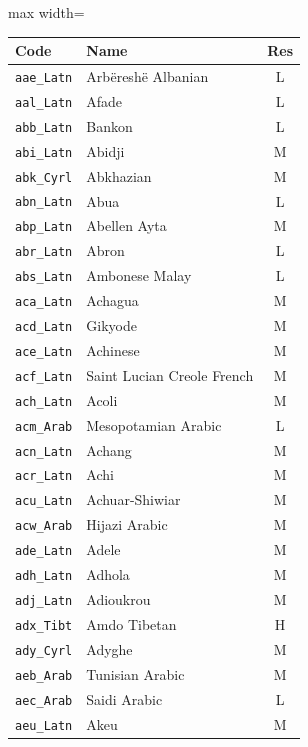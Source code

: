 {
    \tiny\renewcommand{\arraystretch}{.8}
    \begin{adjustbox}{max width=\textwidth}
    \begin{tabular}{llc}
        \toprule
        \textbf{Code} & \textbf{Name} & \textbf{Res}\\
        \midrule
        \texttt{aae\_Latn} & Arbëreshë Albanian & L \\
        \texttt{aal\_Latn} & Afade & L \\
        \texttt{abb\_Latn} & Bankon & L \\
        \texttt{abi\_Latn} & Abidji & M \\
        \texttt{abk\_Cyrl} & Abkhazian & M \\
        \texttt{abn\_Latn} & Abua & L \\
        \texttt{abp\_Latn} & Abellen Ayta & M \\
        \texttt{abr\_Latn} & Abron & L \\
        \texttt{abs\_Latn} & Ambonese Malay & L \\
        \texttt{aca\_Latn} & Achagua & M \\
        \texttt{acd\_Latn} & Gikyode & M \\
        \texttt{ace\_Latn} & Achinese & M \\
        \texttt{acf\_Latn} & Saint Lucian Creole French & M \\
        \texttt{ach\_Latn} & Acoli & M \\
        \texttt{acm\_Arab} & Mesopotamian Arabic & L \\
        \texttt{acn\_Latn} & Achang & M \\
        \texttt{acr\_Latn} & Achi & M \\
        \texttt{acu\_Latn} & Achuar-Shiwiar & M \\
        \texttt{acw\_Arab} & Hijazi Arabic & M \\
        \texttt{ade\_Latn} & Adele & M \\
        \texttt{adh\_Latn} & Adhola & M \\
        \texttt{adj\_Latn} & Adioukrou & M \\
        \texttt{adx\_Tibt} & Amdo Tibetan & H \\
        \texttt{ady\_Cyrl} & Adyghe & M \\
        \texttt{aeb\_Arab} & Tunisian Arabic & M \\
        \texttt{aec\_Arab} & Saidi Arabic & L \\
        \texttt{aeu\_Latn} & Akeu & M \\

\end{tabular}
\end{adjustbox}}
